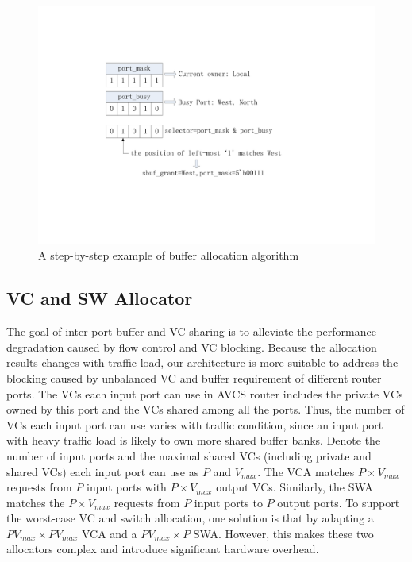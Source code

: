 \documentclass[10pt,conference]{IEEEtran}
\begin{document}
\begin{figure}
\centering\includegraphics[scale=0.5]{figures/Algorithm.pdf}
\caption{A step-by-step example of buffer allocation algorithm}\label{Algorithm}
\end{figure}

\subsection{VC and SW Allocator}\label{allocmux}
The goal of inter-port buffer and VC sharing is to alleviate the performance degradation caused by flow control and VC blocking. Because the allocation results changes with traffic load, our architecture is more suitable to address the blocking caused by unbalanced VC and buffer requirement of different router ports. The VCs each input port can use in AVCS router includes the private VCs owned by this port and the VCs shared among all the ports. Thus, the number of VCs each input port can use varies with traffic condition, since an input port with heavy traffic load is likely to own more shared buffer banks. Denote the number of input ports and the maximal shared VCs (including private and shared VCs) each input port can use as $P$ and $V_{max}$. The VCA matches $P\times V_{max}$ requests from $P$ input ports with $P\times V_{max}$ output VCs. Similarly, the SWA matches the $P\times V_{max}$ requests from $P$ input ports to $P$ output ports. To support the worst-case VC and switch allocation, one solution is that by adapting a $PV_{max}\times PV_{max}$ VCA and a $PV_{max}\times P$ SWA. However, this makes these two allocators complex and introduce significant hardware overhead.

\end{document}
